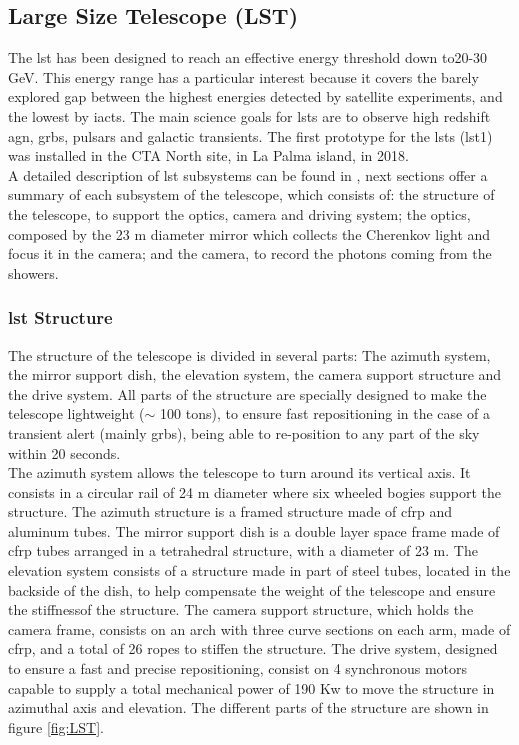 \documentclass[main.tex]{subfiles}
\begin{document}
\subsection{Large Size Telescope (LST)}

The \gls{lst} has been designed to reach an effective energy threshold down to20-30 GeV. This energy range has a particular interest because it covers the barely explored gap between the highest energies detected by satellite experiments, and the lowest by \glspl{iact}. The main science goals for \glspl{lst} are to observe high redshift \gls{agn}, \glspl{grb}, pulsars and galactic transients. The first prototype for the \glspl{lst} (\gls{lst}1) was installed in the CTA North site, in La Palma island, in 2018.\\
A detailed description of \gls{lst} subsystems can be found in \cite{2013LST}, next sections offer a summary of each subsystem of the telescope, which consists of: the structure of the telescope, to support the optics, camera and driving system; the optics, composed by the 23 m diameter mirror which collects the Cherenkov light and focus it in the camera; and the camera, to record the photons coming from the showers.  

\subsubsection{\gls{lst} Structure}

The structure of the telescope is divided in several parts: The azimuth system, the mirror support dish, the elevation system, the camera support structure and the drive system. All parts of the structure are specially designed to make the telescope lightweight ($\sim$ 100 tons), to ensure fast repositioning in the case of a transient alert (mainly \glspl{grb}), being able to re-position to any part of the sky within 20 seconds.\\
The azimuth system allows the telescope to turn around its vertical axis. It consists in a circular rail of 24 m diameter where six wheeled bogies support the structure. The azimuth structure is a framed structure made of \gls{cfrp} and aluminum tubes. The mirror support dish is a double layer space frame made of \gls{cfrp} tubes arranged in a tetrahedral structure, with a diameter of 23 m. The elevation system consists of a structure made in part of steel tubes, located in the backside of the dish, to help compensate the weight of the telescope and ensure the stiffnessof the structure. The camera support structure, which holds the camera frame, consists on an arch with three curve sections on each arm, made of \gls{cfrp}, and a total of 26 ropes to stiffen the structure. The drive system, designed to ensure a fast and precise repositioning, consist on 4 synchronous motors capable to supply a total mechanical power of 190 Kw to move the structure in azimuthal axis and elevation. The different parts of the structure are shown in figure \ref{fig:LST}.
    
\end{document}
